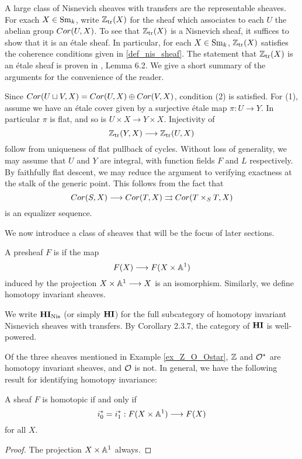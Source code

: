 \begin{ex}
A large class of Nisnevich sheaves with transfers are the 
representable sheaves. For exach $X \in \mathrm{Sm}_{k}$, write $\mathbb{Z}_{\mathrm{tr}}(X)$
for the sheaf which associates to each $U$ the abelian group
$Cor(U, X)$. To see that $\mathbb{Z}_{\mathrm{tr}}(X)$ is a Nisnevich sheaf, it
suffices to show that it is an \'etale sheaf. In particular,
for each $X \in \mathrm{Sm}_{k}$, $\mathbb{Z}_{\mathrm{tr}}(X)$ satisfies the coherence 
conditions given in \ref{def_nis_sheaf}. The statement that
$\mathbb{Z}_{\mathrm{tr}}(X)$ is an \'etale sheaf is proven in \cite{MVW}, Lemma 6.2.
We give a short summary of the arguments for the convenience of
the reader.

Since $Cor(U \sqcup V, X) = Cor(U, X) \oplus Cor(V, X)$, condition 
(2) is satisfied. For (1), assume we have an \'etale cover given
by a surjective \'etale map $\pi: U \to Y$. In particular $\pi$ is
flat, and so is $U \times X \to Y \times X$. Injectivity of
\[
\mathbb{Z}_{\mathrm{tr}}(Y, X) \longrightarrow \mathbb{Z}_{\mathrm{tr}}(U, X)
\]
follow from uniqueness of flat pullback of cycles. Without loss
of generality, we may assume that $U$ and $Y$ are integral, with
function fields $F$ and $L$ respectively. By faithfully flat 
descent, we may reduce the argument to verifying exactness at
the stalk of the generic point. This follows from the fact that
\[
Cor(S, X) \longrightarrow Cor(T, X) \rightrightarrows Cor(T \times_S T, X)
\]
is an equalizer sequence.
\end{ex}

We now introduce a class of sheaves that will be the focus of
later sections.

\begin{defn}
A presheaf $F$ is  if the map 
\[
F(X) \longrightarrow F(X \times \mathbb{A}^1)
\]
induced by the projection $X \times \mathbb{A}^1 \longrightarrow X$ is an isomorphism.
Similarly, we define homotopy invariant sheaves.
\end{defn}

We write $\mathbf{HI}_{\mathrm{Nis}}$ (or simply $\mathbf{HI}$) for the full subcategory 
of homotopy invariant Nisnevich sheaves with transfers. By
\cite{Bo} Corollary 2.3.7, the category of $\mathbf{HI}$ is well-powered.

Of the three sheaves mentioned in Example \ref{ex_Z_O_Ostar}, $\mathbb{Z}$
and $\mathcal{O}^*$ are homotopy invariant sheaves, and $\mathcal{O}$ is not. In 
general, we have the following result for identifying homotopy 
invariance:

\begin{lem}
A sheaf $F$ is homotopic if and only if
\[
i_0^* = i_1^* : F(X \times \mathbb{A}^1) \longrightarrow F(X)
\]
for all $X$.
\end{lem}
\begin{proof}
The projection $X \times \mathbb{A}^1$ always.
\end{proof}

